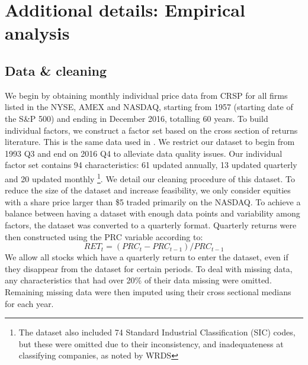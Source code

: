 \documentclass{article}
\begin{document}
\newpage

\section{Additional details: Empirical analysis}
\label{empirical_appendix}

\subsection{Data \& cleaning}\label{app:clean}
We begin by obtaining monthly individual price data from CRSP for all firms listed in the NYSE, AMEX and NASDAQ, starting from 1957 (starting date of the S\&P 500) and ending in December 2016, totalling 60 years. To build individual factors, we construct a factor set based on the cross section of returns literature. This is the same data used in \cite{gu_empirical_2019}. We restrict our dataset to begin from 1993 Q3 and end on 2016 Q4 to alleviate data quality issues. Our individual factor set contains 94 characteristics: 61 updated annually, 13 updated quarterly and 20 updated monthly \footnote{The dataset also included 74 Standard Industrial Classification (SIC) codes, but these were omitted due to their inconsistency, and inadequateness at classifying companies, as noted by WRDS}.
We detail our cleaning procedure of this dataset. To reduce the size of the dataset and increase feasibility, we only consider equities with a share price larger than \$5 traded primarily on the NASDAQ. To achieve a balance between having a dataset with enough data points and variability among factors, the dataset was converted to a quarterly format. Quarterly returns were then constructed using the PRC variable according to:
\begin{equation}
RET_t = (PRC_t - PRC_{t-1})/PRC_{t-1}
\end{equation}
We allow all stocks which have a quarterly return to enter the dataset, even if they disappear from the dataset for certain periods. To deal with missing data, any characteristics that had over 20\% of their data missing were omitted. Remaining missing data were then imputed using their cross sectional medians for each year. 
\end{document}
